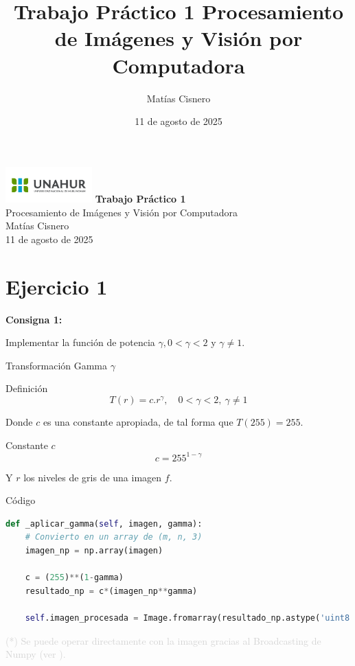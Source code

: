 \documentclass{beamer}
\title{Trabajo Práctico 1 Procesamiento de Imágenes y Visión por Computadora}
\author{Matías Cisnero}
\date{11 de agosto de 2025}
\begin{document}
	
\begin{frame}
	\centering
	\includegraphics[width=0.25\textwidth]{UNAHUR.png}
	\vfill
	{\huge \textbf{Trabajo Práctico 1}}\\[0.2cm]
	{\Large Procesamiento de Imágenes y Visión por Computadora}\\
	\vfill
	{\large Matías Cisnero}\\
	{\small 11 de agosto de 2025}
\end{frame}
	
\section{Ejercicio 1}
	
\begin{frame}
	\begin{center}
		\textcolor{unahurverde}{\textbf{Consigna 1:}}
	\end{center}
	\justifying
	
	Implementar la función de potencia $\gamma, 0 < \gamma < 2$ y $\gamma \neq 1$.
\end{frame}

\begin{frame}[fragile]{Transformación Gamma $\gamma$}
	\justifying

	\begin{block}{Definición}
		\[
		T(r) = c . r^\gamma, \quad 0 < \gamma < 2, \ \gamma \neq 1
		\]
	\end{block}
	
	Donde $c$ es una constante apropiada, de tal forma que $T(255) = 255$.
	
	\begin{block}{Constante $c$}
		\[
		c = 255^{1-\gamma}
		\]
	\end{block}
	
	Y $r$ los niveles de gris de una imagen $f$.
\end{frame}

\begin{frame}[fragile]{Código}
	\justifying
	
	\begin{lstlisting}[language=Python]
def _aplicar_gamma(self, imagen, gamma):
	# Convierto en un array de (m, n, 3)
	imagen_np = np.array(imagen)
			
	c = (255)**(1-gamma)
	resultado_np = c*(imagen_np**gamma)
			
	self.imagen_procesada = Image.fromarray(resultado_np.astype('uint8'))
	\end{lstlisting}
	
 \vfill
	\footnotesize \textcolor{lightgray}{(*) Se puede operar directamente con la imagen gracias al Broadcasting de Numpy (ver \cite{numpy-broadcasting}).}
\end{frame}
\end{document}
